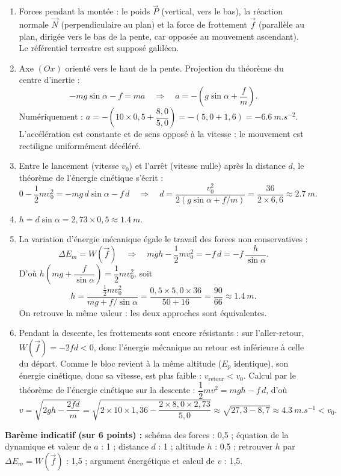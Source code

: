 \documentclass[11pt]{article}
\newcounter{popsec}
\newcounter{popsub}
\newcommand{\courssub}[1]{%
  \stepcounter{popsub}%
  \par\vspace{9pt}\noindent{\popxbold\fontsize{11.5}{13}\selectfont\color{popink}{\color{poporange}\thepopsec.\thepopsub}\hspace{6pt}#1}\par\nopagebreak\vspace{4pt}
}
\begin{document}
\courssub{Je me prépare au Bac}

\begin{corrige}
\begin{enumerate}
\item Forces pendant la montée : le poids $\vec{P}$ (vertical, vers le bas), la réaction normale $\vec{N}$ (perpendiculaire au plan) et la force de frottement $\vec{f}$ (parallèle au plan, dirigée vers le bas de la pente, car opposée au mouvement ascendant). Le référentiel terrestre est supposé galiléen.
\item Axe $(Ox)$ orienté vers le haut de la pente. Projection du théorème du centre d'inertie :
\[ -mg\sin\alpha - f = ma \quad\Rightarrow\quad a = -\left(g\sin\alpha + \frac{f}{m}\right). \]
Numériquement : $a = -\left(10 \times 0{,}5 + \dfrac{8{,}0}{5{,}0}\right) = -(5{,}0 + 1{,}6) = \SI{-6,6}{m.s^{-2}}$. L'accélération est constante et de sens opposé à la vitesse : le mouvement est rectiligne uniformément décéléré.
\item Entre le lancement (vitesse $v_0$) et l'arrêt (vitesse nulle) après la distance $d$, le théorème de l'énergie cinétique s'écrit :
\[ 0 - \frac{1}{2}mv_0^2 = -mg\,d\sin\alpha - f\,d \quad\Rightarrow\quad d = \frac{v_0^2}{2\left(g\sin\alpha + f/m\right)} = \frac{36}{2 \times 6{,}6} \approx \SI{2,7}{m}. \]
\item $h = d\sin\alpha = 2{,}73 \times 0{,}5 \approx \SI{1,4}{m}$.
\item La variation d'énergie mécanique égale le travail des forces non conservatives :
\[ \Delta E_m = W(\vec{f}) \quad\Rightarrow\quad mgh - \frac{1}{2}mv_0^2 = -f\,d = -f\,\frac{h}{\sin\alpha}. \]
D'où $h\left(mg + \dfrac{f}{\sin\alpha}\right) = \dfrac{1}{2}mv_0^2$, soit
\[ h = \frac{\tfrac{1}{2}mv_0^2}{mg + f/\sin\alpha} = \frac{0{,}5 \times 5{,}0 \times 36}{50 + 16} = \frac{90}{66} \approx \SI{1,4}{m}. \]
On retrouve la même valeur : les deux approches sont équivalentes.
\item Pendant la descente, les frottements sont encore résistants : sur l'aller-retour, $W(\vec{f}) = -2fd < 0$, donc l'énergie mécanique au retour est inférieure à celle du départ. Comme le bloc revient à la même altitude ($E_p$ identique), son énergie cinétique, donc sa vitesse, est plus faible : $v_{\mathrm{retour}} < v_0$. Calcul par le théorème de l'énergie cinétique sur la descente : $\dfrac{1}{2}mv^2 = mgh - f\,d$, d'où
\[ v = \sqrt{2gh - \frac{2fd}{m}} = \sqrt{2 \times 10 \times 1{,}36 - \frac{2 \times 8{,}0 \times 2{,}73}{5{,}0}} \approx \sqrt{27{,}3 - 8{,}7} \approx \SI{4,3}{m.s^{-1}} < v_0. \]
\end{enumerate}
\textbf{Barème indicatif (sur 6 points) :} schéma des forces : 0,5 ; équation de la dynamique et valeur de $a$ : 1 ; distance $d$ : 1 ; altitude $h$ : 0,5 ; retrouver $h$ par $\Delta E_m = W(\vec{f})$ : 1,5 ; argument énergétique et calcul de $v$ : 1,5.


\end{corrige}
\end{document}

